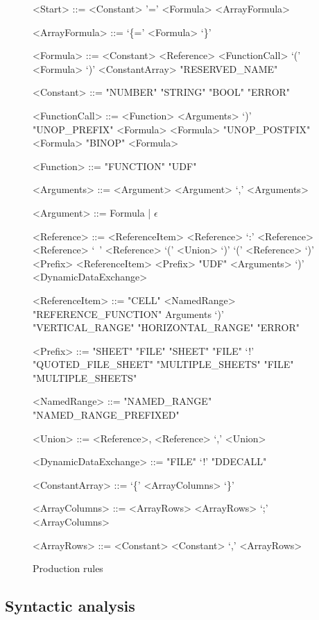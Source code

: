 \documentclass[conference]{IEEEtran}
\begin{document}
\begin{figure}
\centering
\label{figure:productions}
\caption{Production rules}
\begin{grammar}
<Start> ::= <Constant>
	\alt '=' <Formula>
	\alt <ArrayFormula>
	
<ArrayFormula> ::= `\{=' <Formula> `\}'

<Formula> ::= <Constant>
         \alt <Reference>
         \alt <FunctionCall>
         \alt `(' <Formula> `)'
         \alt <ConstantArray>
         \alt "RESERVED_NAME"
         
<Constant> ::= "NUMBER"
         \alt "STRING"
         \alt "BOOL"
         \alt "ERROR"
         
<FunctionCall> ::= <Function> <Arguments> `)'
		\alt "UNOP_PREFIX" <Formula>
		\alt <Formula> "UNOP_POSTFIX"
		\alt <Formula> "BINOP" <Formula>

<Function> ::= "FUNCTION"
	\alt "UDF"
	
<Arguments> ::= <Argument>
	\alt <Argument> `,' <Arguments>

<Argument> ::= Formula | $\epsilon$

<Reference> ::= <ReferenceItem>
	\alt <Reference> `:' <Reference>
	\alt <Reference> `\ ' <Reference>
	\alt `(' <Union> `)'
	\alt `(' <Reference> `)' 
	\alt <Prefix> <ReferenceItem>
    \alt <Prefix> "UDF" <Arguments> `)'
    \alt <DynamicDataExchange>
    
<ReferenceItem> ::= "CELL"
	\alt <NamedRange>
	\alt "REFERENCE_FUNCTION" Arguments `)'
	\alt "VERTICAL_RANGE"
	\alt "HORIZONTAL_RANGE"
	\alt "ERROR"
	
<Prefix> ::= "SHEET"
	\alt "FILE" "SHEET"
	\alt "FILE" `!'
	\alt "QUOTED_FILE_SHEET"
	\alt "MULTIPLE_SHEETS"
	\alt "FILE" "MULTIPLE_SHEETS"
	
<NamedRange> ::= "NAMED_RANGE"
            \alt "NAMED_RANGE_PREFIXED"

<Union> ::= <Reference>,
	\alt <Reference> `,' <Union>
	
<DynamicDataExchange> ::= "FILE" `!' "DDECALL"

<ConstantArray> ::= `\{' <ArrayColumns> `\}'

<ArrayColumns> ::= <ArrayRows>
	\alt <ArrayRows> `;' <ArrayColumns>

<ArrayRows> ::= <Constant>
	\alt <Constant> `,' <ArrayRows>

\end{grammar}
\end{figure}

\subsection{Syntactic analysis}
\label{subsection:productionRules}
\end{document}
